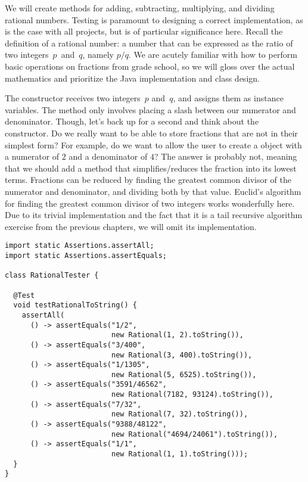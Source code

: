 


We will create methods for adding, subtracting, multiplying, and dividing rational numbers. 
Testing is paramount to designing a correct implementation, as is the case with all projects, but is of particular significance here. 
Recall the definition of a rational number: a number that can be expressed as the ratio of two integers~$p$~and~$q$, namely $p/q$. 
We are acutely familiar with how to perform basic operations on fractions from grade school, so we will gloss over the actual mathematics and prioritize the Java implementation and class design.

The  constructor receives two integers~$p$ and~$q$, and assigns them as instance variables. 
The  method only involves placing a slash between our numerator and denominator. 
Though, let's back up for a second and think about the constructor. 
Do we really want to be able to store fractions that are not in their simplest form? 
For example, do we want to allow the user to create a  object with a numerator of $2$ and a denominator of $4$? 
The answer is probably not, meaning that we should add a method that simplifies/reduces the fraction into its lowest terms.
Fractions can be reduced by finding the greatest common divisor of the numerator and denominator, and dividing both by that value. 
Euclid's algorithm for finding the greatest common divisor of two integers works wonderfully here. 
Due to its trivial implementation and the fact that it is a tail recursive algorithm exercise from the previous chapters, we will omit its implementation.

\begin{lstlisting}[language=MyJava]
import static Assertions.assertAll;
import static Assertions.assertEquals;

class RationalTester {
  
  @Test
  void testRationalToString() {
    assertAll(
      () -> assertEquals("1/2", 
                         new Rational(1, 2).toString()),
      () -> assertEquals("3/400", 
                         new Rational(3, 400).toString()),
      () -> assertEquals("1/1305", 
                         new Rational(5, 6525).toString()),
      () -> assertEquals("3591/46562", 
                         new Rational(7182, 93124).toString()),
      () -> assertEquals("7/32", 
                         new Rational(7, 32).toString()),
      () -> assertEquals("9388/48122", 
                         new Rational("4694/24061").toString()),
      () -> assertEquals("1/1", 
                         new Rational(1, 1).toString()));
  }
}
\end{lstlisting}


